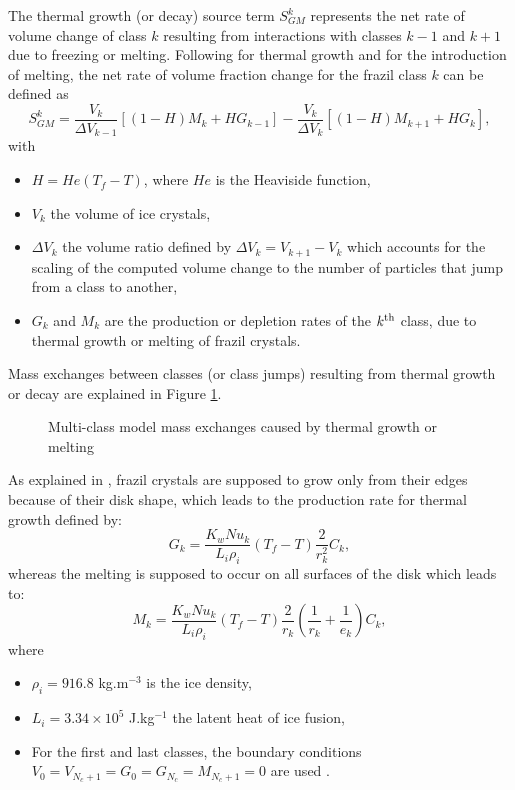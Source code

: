 The thermal growth (or decay) source term $S_{GM}^{k}$ represents the net rate of volume change of class $k$
resulting from interactions with classes $k-1$ and $k+1$ due to freezing or melting.
Following \cite{shen_JHR_2010} for thermal growth and \cite{holland_JFM_2005} for the introduction of melting, the net rate of volume fraction change for the frazil class $k$ can be defined as
\begin{equation}
S_{GM}^{k}=\frac{V_{k}}{\Delta V_{k-1}}\left [ (1-H)M_{k}+HG_{k-1} \right ]-\frac{V_{k}}{\Delta V_{k}}\left [ (1-H)M_{k+1}+HG_{k} \right ],
\label{eq:model:sgm:source}
\end{equation}
with
\begin{itemize}
	\item $H=He(T_{f}-T)$, where $He$ is the Heaviside function,
    \item $V_{k}$ the volume of ice crystals,
    \item $\Delta V_{k}$ the volume ratio defined by $\Delta V_{k}=V_{k+1}-V_{k}$ which accounts for the scaling of the computed volume change to the number of particles that jump from a class to another,
    \item $G_k$ and $M_k$ are the production or depletion rates of the $k^{\rm{th}}$ class, due to thermal growth or melting of frazil crystals.
\end{itemize}

Mass exchanges between classes (or class jumps) resulting from thermal growth or decay are explained in Figure \ref{fig:sgm_class_jumps}.
\begin{figure}[H]
    \begin{center}
    \end{center}
    \caption{Multi-class model mass exchanges caused by thermal growth or melting}
    \label{fig:sgm_class_jumps}
\end{figure}

As explained in \cite{daly_1994}, frazil crystals are supposed to
grow only from their edges because of their disk shape, which
leads to the production rate for thermal growth defined by:
\begin{equation}
G_{k}=\frac{K_{w}Nu_{k}}{L_{i}\rho_{i}}(T_{f}-T)\frac{2}{r_{k}^{2}}C_{k},
\label{eq:model:sgm:source_growth}
\end{equation}
whereas the melting is supposed to occur on all surfaces of the
disk which leads to:
\begin{equation}
M_{k}=\frac{K_{w}Nu_{k}}{L_{i}\rho_{i}}(T_{f}-T)\frac{2}{r_{k}}\left(\frac{1}{r_{k}}+\frac{1}{e_{k}}\right)C_{k},
\label{eq:model:sgm:source_melting}
\end{equation}
where
\begin{itemize}
	\item $\rho_{i}=916.8$ kg.m$^{-3}$ is the ice density,
	\item $L_{i}=3.34 \times 10^5$ J.kg$^{-1}$ the latent heat of ice fusion,
    \item For the first and last classes, the boundary conditions $V_{0}=V_{N_c+1}=G_{0}=G_{N_c}=M_{N_c+1}=0$
are used \cite{holland_JFM_2005}.
\end{itemize}


